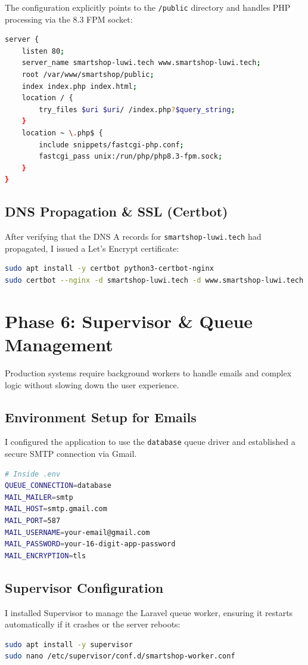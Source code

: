 \documentclass[12pt,a4paper]{article}
\begin{document}
The configuration explicitly points to the \texttt{/public} directory and handles PHP processing via the 8.3 FPM socket:
\begin{lstlisting}[language=bash]
server {
    listen 80;
    server_name smartshop-luwi.tech www.smartshop-luwi.tech;
    root /var/www/smartshop/public;
    index index.php index.html;
    location / {
        try_files $uri $uri/ /index.php?$query_string;
    }
    location ~ \.php$ {
        include snippets/fastcgi-php.conf;
        fastcgi_pass unix:/run/php/php8.3-fpm.sock;
    }
}
\end{lstlisting}

\subsection{DNS Propagation \& SSL (Certbot)}
After verifying that the DNS A records for \texttt{smartshop-luwi.tech} had propagated, I issued a Let's Encrypt certificate:
\begin{lstlisting}[language=bash]
sudo apt install -y certbot python3-certbot-nginx
sudo certbot --nginx -d smartshop-luwi.tech -d www.smartshop-luwi.tech
\end{lstlisting}

\newpage

\section{Phase 6: Supervisor \& Queue Management}
Production systems require background workers to handle emails and complex logic without slowing down the user experience.

\subsection{Environment Setup for Emails}
I configured the application to use the \texttt{database} queue driver and established a secure SMTP connection via Gmail.
\begin{lstlisting}[language=bash]
# Inside .env
QUEUE_CONNECTION=database
MAIL_MAILER=smtp
MAIL_HOST=smtp.gmail.com
MAIL_PORT=587
MAIL_USERNAME=your-email@gmail.com
MAIL_PASSWORD=your-16-digit-app-password
MAIL_ENCRYPTION=tls
\end{lstlisting}

\subsection{Supervisor Configuration}
I installed Supervisor to manage the Laravel queue worker, ensuring it restarts automatically if it crashes or the server reboots:
\begin{lstlisting}[language=bash]
sudo apt install -y supervisor
sudo nano /etc/supervisor/conf.d/smartshop-worker.conf
\end{lstlisting}
\end{document}

